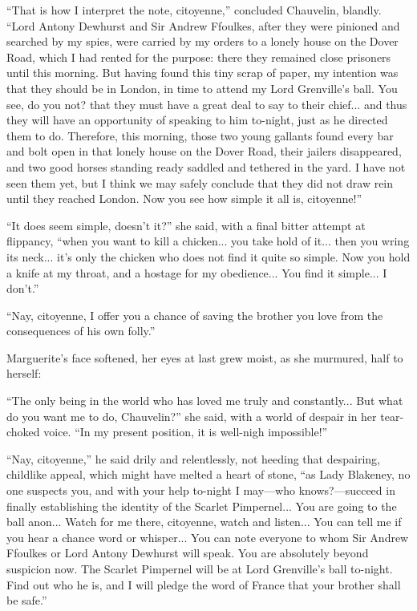 \documentclass[paper=a5,BCOR=7mm,twoside,DIV=calc,12pt,usegeometry,chapterprefix,endperiod,headings=big]{scrbook}
\begin{document}
\enquote{That is how I interpret the note, citoyenne,} concluded Chauvelin, blandly. \enquote{Lord Antony Dewhurst and Sir Andrew Ffoulkes, after they were pinioned and searched by my spies, were carried by my orders to a lonely house on the Dover Road, which I had rented for the purpose: there they remained close prisoners until this morning. But having found this tiny scrap of paper, my intention was that they should be in London, in time to attend my Lord Grenville's ball. You see, do you not? that they must have a great deal to say to their chief... and thus they will have an opportunity of speaking to him to-night, just as he directed them to do. Therefore, this morning, those two young gallants found every bar and bolt open in that lonely house on the Dover Road, their jailers disappeared, and two good horses standing ready saddled and tethered in the yard. I have not seen them yet, but I think we may safely conclude that they did not draw rein until they reached London. Now you see how simple it all is, citoyenne!}

\enquote{It does seem simple, doesn't it?} she said, with a final bitter attempt at flippancy, \enquote{when you want to kill a chicken... you take hold of it... then you wring its neck... it's only the chicken who does not find it quite so simple. Now you hold a knife at my throat, and a hostage for my obedience... You find it simple... I don't.}

\enquote{Nay, citoyenne, I offer you a chance of saving the brother you love from the consequences of his own folly.}

Marguerite's face softened, her eyes at last grew moist, as she murmured, half to herself:

\enquote{The only being in the world who has loved me truly and constantly... But what do you want me to do, Chauvelin?} she said, with a world of despair in her tear-choked voice. \enquote{In my present position, it is well-nigh impossible!}

\enquote{Nay, citoyenne,} he said drily and relentlessly, not heeding that despairing, childlike appeal, which might have melted a heart of stone, \enquote{as Lady Blakeney, no one suspects you, and with your help to-night I may---who knows?---succeed in finally establishing the identity of the Scarlet Pimpernel... You are going to the ball anon... Watch for me there, citoyenne, watch and listen... You can tell me if you hear a chance word or whisper... You can note everyone to whom Sir Andrew Ffoulkes or Lord Antony Dewhurst will speak. You are absolutely beyond suspicion now. The Scarlet Pimpernel will be at Lord Grenville's ball to-night. Find out who he is, and I will pledge the word of France that your brother shall be safe.}
\end{document}
